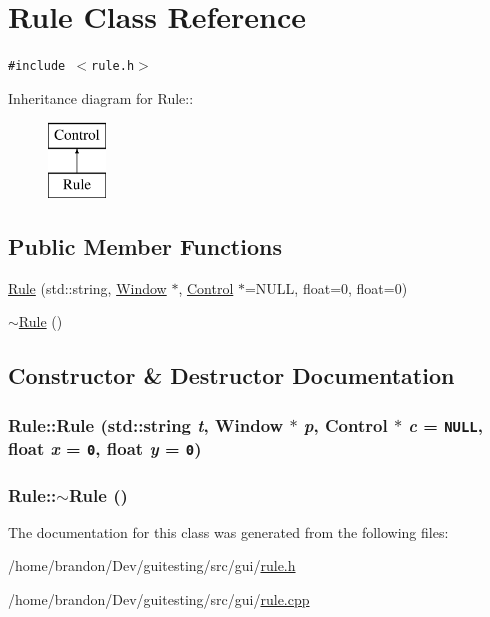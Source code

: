 \hypertarget{class_rule}{
\section{Rule Class Reference}
\label{class_rule}
}
{\tt \#include $<$rule.h$>$}

Inheritance diagram for Rule::\begin{figure}[H]
\begin{center}
\leavevmode
\includegraphics[height=2cm]{class_rule}
\end{center}
\end{figure}
\subsection*{Public Member Functions}
\begin{CompactItemize}
\item 
\hyperlink{class_rule_ff93a37bd6d6bea16ab95ec8801ff7f1}{Rule} (std::string, \hyperlink{class_window}{Window} $\ast$, \hyperlink{class_control}{Control} $\ast$=NULL, float=0, float=0)
\item 
\hyperlink{class_rule_92760fc705b3da696f86e42b77943c21}{$\sim$Rule} ()
\end{CompactItemize}


\subsection{Constructor \& Destructor Documentation}
\hypertarget{class_rule_ff93a37bd6d6bea16ab95ec8801ff7f1}{
\subsubsection[{Rule}]{\setlength{\rightskip}{0pt plus 5cm}Rule::Rule (std::string {\em t}, \/  {\bf Window} $\ast$ {\em p}, \/  {\bf Control} $\ast$ {\em c} = {\tt NULL}, \/  float {\em x} = {\tt 0}, \/  float {\em y} = {\tt 0})}}
\label{class_rule_ff93a37bd6d6bea16ab95ec8801ff7f1}


\hypertarget{class_rule_92760fc705b3da696f86e42b77943c21}{
\subsubsection[{$\sim$Rule}]{\setlength{\rightskip}{0pt plus 5cm}Rule::$\sim$Rule ()}}
\label{class_rule_92760fc705b3da696f86e42b77943c21}




The documentation for this class was generated from the following files:\begin{CompactItemize}
\item 
/home/brandon/Dev/guitesting/src/gui/\hyperlink{rule_8h}{rule.h}\item 
/home/brandon/Dev/guitesting/src/gui/\hyperlink{rule_8cpp}{rule.cpp}\end{CompactItemize}
